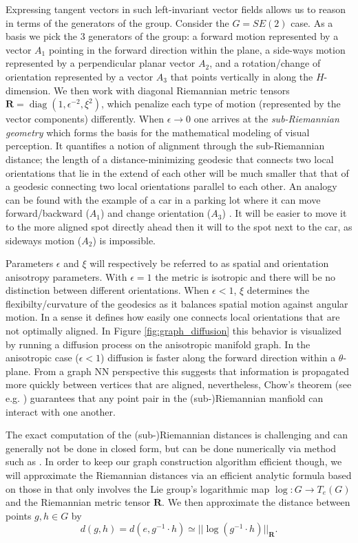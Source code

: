 \documentclass{article}
\DeclareMathOperator{\diag}{diag}
\begin{document}
Expressing tangent vectors in such left-invariant vector fields allows us to reason in terms of the generators of the group. Consider the $G=SE(2)$ case. As a basis we pick the 3 generators of the group: a forward motion represented by a vector $A_1$ pointing in the forward direction within the plane, a side-ways motion represented by a perpendicular planar vector $A_2$, and a rotation/change of orientation represented by a vector $A_3$ that points vertically in along the $H$-dimension. We then work with diagonal Riemannian metric tensors $\mathbf{R} = \diag (1, \epsilon^{-2}, \xi^{2})$, which penalize each type of motion (represented by the vector components) differently. When $\epsilon \rightarrow 0$ one arrives at the \textit{sub-Riemannian geometry} which forms the basis for the mathematical modeling of visual perception. It quantifies a notion of alignment through the sub-Riemannian distance; the length of a distance-minimizing geodesic that connects two local orientations that lie in the extend of each other will be much smaller that that of a geodesic connecting two local orientations parallel to each other. An analogy can be found with the example of a car in a parking lot where it can move forward/backward ($A_1$) and change orientation ($A_3$) \citep{reeds1990optimal}. It will be easier to move it to the more aligned spot directly ahead then it will to the spot next to the car, as sideways motion ($A_2$) is impossible.  

Parameters $\epsilon$ and $\xi$ will respectively be referred to as spatial and orientation anisotropy parameters. With $\epsilon=1$ the metric is isotropic and there will be no distinction between different orientations. When $\epsilon < 1$, $\xi$ determines the flexibilty/curvature of the geodesics as it balances spatial motion against angular motion. In a sense it defines how easily one connects local orientations that are not optimally aligned. In Figure \ref{fig:graph_diffusion} this behavior is visualized by running a diffusion process on the anisotropic manifold graph. In the anisotropic case ($\epsilon<1$) diffusion is faster along the forward direction within a $\theta$-plane. From a graph NN perspective this suggests that information is propagated more quickly between vertices that are aligned, nevertheless, Chow's theorem (see e.g. \citep{mont}) guarantees that any point pair in the (sub-)Riemannian manfiold can interact with one another.

The exact computation of the (sub-)Riemannian distances is challenging and can generally not be done in closed form, but can be done numerically via method such as \citep{bekkers_pde_2015,sanguinetti2015fastmarching,mashtakov2017tracking}. In order to keep our graph construction algorithm efficient though, we will approximate the Riemannian distances via an efficient analytic formula based on those in \citep{bekkers2018nilpotent} that only involves the Lie group's logarithmic map $\log:G \rightarrow T_e(G)$ and the Riemannian metric tensor $\mathbf{R}$. We then approximate the distance between points $g,h \in G$ by 
\begin{equation}
d(g, h) = d(e, g^{-1} \cdot h) \simeq ||\log (g^{-1} \cdot h)||_{\mathbf{R}}.
\end{equation}
\end{document}
